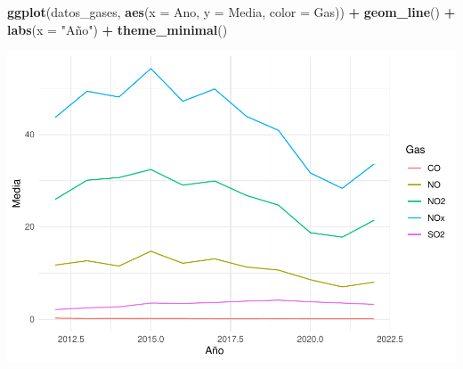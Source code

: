 \documentclass[notspecified,article,submit,moreauthors,pdftex]{Definitions/mdpi}
\newenvironment{Shaded}{\begin{snugshade}}{\end{snugshade}}
\newcommand{\AttributeTok}[1]{\textcolor[rgb]{0.13,0.29,0.53}{#1}}
\newcommand{\FunctionTok}[1]{\textcolor[rgb]{0.13,0.29,0.53}{\textbf{#1}}}
\newcommand{\NormalTok}[1]{#1}
\newcommand{\SpecialCharTok}[1]{\textcolor[rgb]{0.81,0.36,0.00}{\textbf{#1}}}
\newcommand{\StringTok}[1]{\textcolor[rgb]{0.31,0.60,0.02}{#1}}
\begin{document}
\begin{Shaded}
\begin{Highlighting}[]
\FunctionTok{ggplot}\NormalTok{(datos\_gases, }\FunctionTok{aes}\NormalTok{(}\AttributeTok{x =}\NormalTok{ Ano, }\AttributeTok{y =}\NormalTok{ Media, }\AttributeTok{color =}\NormalTok{ Gas)) }\SpecialCharTok{+}
  \FunctionTok{geom\_line}\NormalTok{() }\SpecialCharTok{+}
  \FunctionTok{labs}\NormalTok{(}\AttributeTok{x =} \StringTok{"Año"}\NormalTok{) }\SpecialCharTok{+}
  \FunctionTok{theme\_minimal}\NormalTok{()}
\end{Highlighting}
\end{Shaded}

\includegraphics{Memoria_files/figure-latex/unnamed-chunk-32-1.pdf}


\vspace{6pt}










\end{document}
